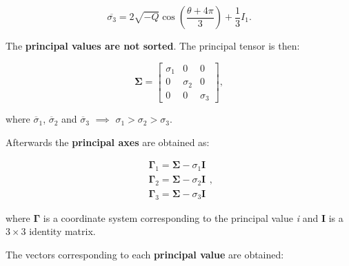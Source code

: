 \documentclass[10pt,b5paper,titlepage]{book}
\begin{document}
\begin{itemize}
        \begin{equation}
            \overline{\sigma_{3}}
            = 2 \sqrt{-Q} \cos{\left(\frac{\theta + 4 \pi}{3}\right)} + \frac{1}{3}I_{1}
        .\end{equation}

        The \textbf{principal values are not sorted}. The principal tensor is then:

        \begin{equation}
            \mathbf{\Sigma} = \begin{bmatrix}
                \sigma_{1} & 0 & 0 \\
                0 & \sigma_{2}  & 0 \\
                0 & 0 & \sigma_{3}
            \end{bmatrix}
        ,\end{equation}

        where $\overline{\sigma}_{1}$, $\overline{\sigma}_{2}$ and $\overline{\sigma}_{3}$
        $\implies$ $\sigma_1 > \sigma_2 > \sigma_3$.

        Afterwards the \textbf{principal axes} are obtained as:

        \begin{equation}
            \begin{array}{l}
                \mathbf{\Gamma}_{1} = \mathbf{\Sigma} - \sigma_{1}\mathbf{I} \\
                \mathbf{\Gamma}_{2} = \mathbf{\Sigma} - \sigma_{2}\mathbf{I} \\
                \mathbf{\Gamma}_{3} = \mathbf{\Sigma} - \sigma_{3}\mathbf{I}
            \end{array}
        ,\end{equation}

        where $\mathbf{\Gamma}$ is a coordinate system corresponding to the
        principal value \textit{i} and $\mathbf{I}$ is a $3 \times 3$
        identity matrix.

        The vectors corresponding to each \textbf{principal value} are obtained:


\end{itemize}
\end{document}
